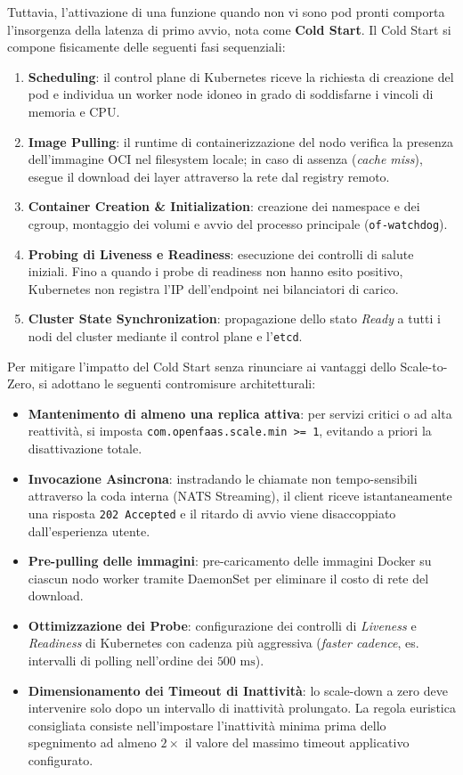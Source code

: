 \documentclass[11pt, a4paper]{article}
\begin{document}
Tuttavia, l'attivazione di una funzione quando non vi sono pod pronti comporta l'insorgenza della latenza di primo avvio, nota come \textbf{Cold Start}. Il Cold Start si compone fisicamente delle seguenti fasi sequenziali:
\begin{enumerate}
    \item \textbf{Scheduling}: il control plane di Kubernetes riceve la richiesta di creazione del pod e individua un worker node idoneo in grado di soddisfarne i vincoli di memoria e CPU.
    \item \textbf{Image Pulling}: il runtime di containerizzazione del nodo verifica la presenza dell'immagine OCI nel filesystem locale; in caso di assenza (\emph{cache miss}), esegue il download dei layer attraverso la rete dal registry remoto.
    \item \textbf{Container Creation \& Initialization}: creazione dei namespace e dei cgroup, montaggio dei volumi e avvio del processo principale (\texttt{of-watchdog}).
    \item \textbf{Probing di Liveness e Readiness}: esecuzione dei controlli di salute iniziali. Fino a quando i probe di readiness non hanno esito positivo, Kubernetes non registra l'IP dell'endpoint nei bilanciatori di carico.
    \item \textbf{Cluster State Synchronization}: propagazione dello stato \emph{Ready} a tutti i nodi del cluster mediante il control plane e l'\texttt{etcd}.
\end{enumerate}

Per mitigare l'impatto del Cold Start senza rinunciare ai vantaggi dello Scale-to-Zero, si adottano le seguenti contromisure architetturali:
\begin{itemize}[noitemsep]
    \item \textbf{Mantenimento di almeno una replica attiva}: per servizi critici o ad alta reattività, si imposta \texttt{com.openfaas.scale.min >= 1}, evitando a priori la disattivazione totale.
    \item \textbf{Invocazione Asincrona}: instradando le chiamate non tempo-sensibili attraverso la coda interna (NATS Streaming), il client riceve istantaneamente una risposta \texttt{202 Accepted} e il ritardo di avvio viene disaccoppiato dall'esperienza utente.
    \item \textbf{Pre-pulling delle immagini}: pre-caricamento delle immagini Docker su ciascun nodo worker tramite DaemonSet per eliminare il costo di rete del download.
    \item \textbf{Ottimizzazione dei Probe}: configurazione dei controlli di \emph{Liveness} e \emph{Readiness} di Kubernetes con cadenza più aggressiva (\emph{faster cadence}, es. intervalli di polling nell'ordine dei $500\text{ ms}$).
    \item \textbf{Dimensionamento dei Timeout di Inattività}: lo scale-down a zero deve intervenire solo dopo un intervallo di inattività prolungato. La regola euristica consigliata consiste nell'impostare l'inattività minima prima dello spegnimento ad almeno $2\times$ il valore del massimo timeout applicativo configurato.
\end{itemize}
\end{document}
